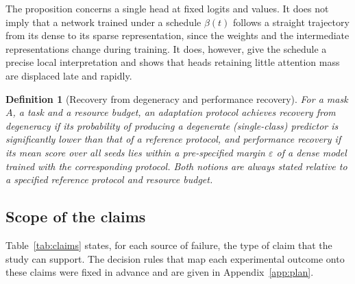 \documentclass[10pt]{article}
\newtheorem{definition}{Definition}
\begin{document}
The proposition concerns a single head at fixed logits and values. It does not imply that a network trained under a schedule $\beta(t)$ follows a straight trajectory from its dense to its sparse representation, since the weights and the intermediate representations change during training. It does, however, give the schedule a precise local interpretation and shows that heads retaining little attention mass are displaced late and rapidly.

\begin{definition}[Recovery from degeneracy and performance recovery]
\label{def:rescue}
For a mask $A$, a task and a resource budget, an adaptation protocol achieves \emph{recovery from degeneracy} if its probability of producing a degenerate (single-class) predictor is significantly lower than that of a reference protocol, and \emph{performance recovery} if its mean score over all seeds lies within a pre-specified margin $\varepsilon$ of a dense model trained with the corresponding protocol. Both notions are always stated relative to a specified reference protocol and resource budget.
\end{definition}

\subsection{Scope of the claims}
\label{sec:hyp}

Table~\ref{tab:claims} states, for each source of failure, the type of claim that the study can support. The decision rules that map each experimental outcome onto these claims were fixed in advance and are given in Appendix~\ref{app:plan}.
\end{document}
